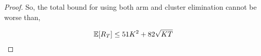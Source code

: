 \begin{proof}
	So, the total bound for using both arm and cluster elimination cannot be worse than,
	
	\begin{align*}
	\mathbb{E}[R_{T}]\leq 51 K^2 + 82\sqrt{KT}
	\end{align*}		
\end{proof}